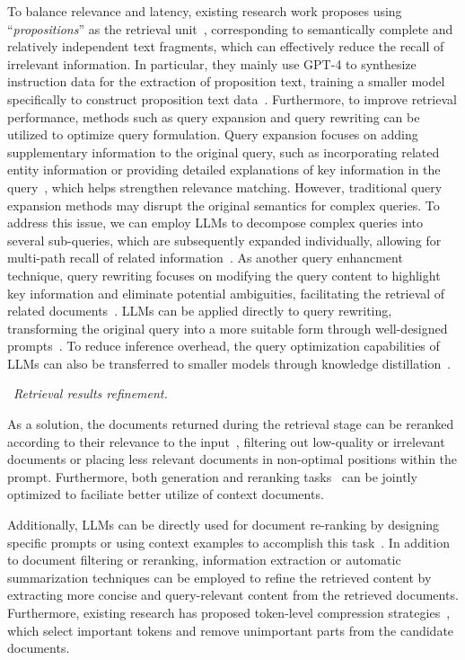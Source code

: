 To balance relevance and latency, existing research work proposes using ``\emph{propositions}'' as the retrieval unit~\cite{chen2023dense}, corresponding to semantically complete and relatively independent text fragments, which can effectively reduce the recall of irrelevant information. In particular, they mainly use GPT-4 to synthesize instruction data for the extraction of proposition text, training a smaller model specifically to construct proposition text data~\cite{chen2023dense}. Furthermore, to improve retrieval performance, methods such as query expansion and query rewriting can be utilized to optimize query formulation. Query expansion focuses on adding supplementary information to the original query, such as incorporating related entity information or providing detailed explanations of key information in the query~\cite{Wang-arxiv-2023-query2doc}, which helps strengthen relevance matching. However, traditional query expansion methods may disrupt the original semantics for complex queries. To address this issue, we can employ LLMs to decompose complex queries into several sub-queries, which are subsequently expanded individually, allowing for multi-path recall of related information~\cite{huang2023question}. As another query enhancment technique, query rewriting focuses on modifying the query content to highlight key information and eliminate potential ambiguities, facilitating the retrieval of related documents~\cite{he2016learning}. LLMs can be applied directly to query rewriting, transforming the original query into a more suitable form through well-designed prompts~\cite{liu2024query}. To reduce inference overhead, the query optimization capabilities of LLMs can also be transferred to smaller models through knowledge distillation~\cite{ye2023enhancing}.

{\textbullet~\emph{Retrieval results refinement.}}

As a solution, the documents returned during the retrieval stage can be reranked according to their relevance to the input~\cite{jeong2024adaptive}, filtering out low-quality or irrelevant documents or placing less relevant documents in non-optimal positions within the prompt. Furthermore, both generation and reranking tasks~\cite{wang2024rear} can be jointly optimized to faciliate better utilize of context documents. 

Additionally, LLMs can be directly used for document re-ranking by designing specific prompts or using context examples to accomplish this task~\cite{sun-arxiv-2023-chatgpt}. In addition to document filtering or reranking, information extraction or automatic summarization techniques can be employed to refine the retrieved content by extracting more concise and query-relevant content from the retrieved documents. Furthermore, existing research has proposed token-level compression strategies~\cite{jiang2023llmlingua}, which select important tokens and remove unimportant parts from the candidate documents. 

